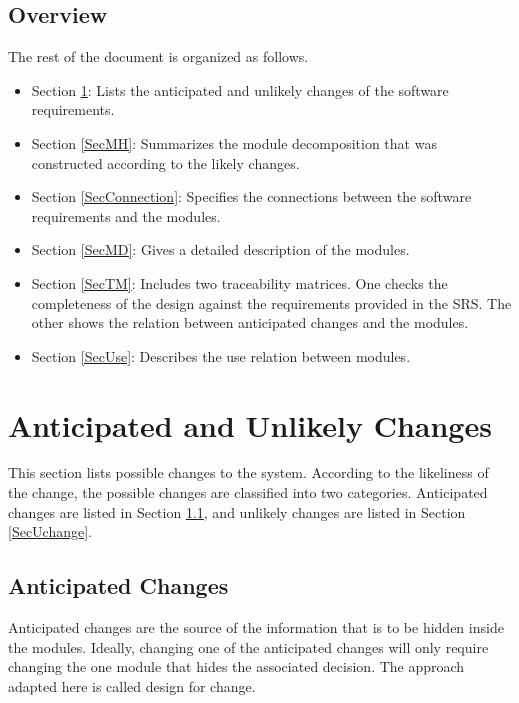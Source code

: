 \documentclass[12pt, titlepage]{article}
\begin{document}
\subsection{Overview}
The rest of the document is organized as follows. 
\begin{itemize}
  \item Section \ref{SecChange}: Lists the anticipated and unlikely changes of the software
  requirements.
  \item Section \ref{SecMH}: Summarizes the module decomposition that
  was constructed according to the likely changes.
  \item Section \ref{SecConnection}: Specifies the connections between the software requirements and the modules.
  \item Section \ref{SecMD}: Gives a detailed description of the
  modules.
  \item Section \ref{SecTM}: Includes two traceability matrices. One checks
  the completeness of the design against the requirements provided in the SRS. The
  other shows the relation between anticipated changes and the modules.
  \item Section \ref{SecUse}: Describes the use relation between modules.
\end{itemize}
\section{Anticipated and Unlikely Changes} \label{SecChange}

This section lists possible changes to the system. According to the likeliness
of the change, the possible changes are classified into two
categories. Anticipated changes are listed in Section \ref{SecAchange}, and
unlikely changes are listed in Section \ref{SecUchange}.

\subsection{Anticipated Changes} \label{SecAchange}

Anticipated changes are the source of the information that is to be hidden
inside the modules. Ideally, changing one of the anticipated changes will only
require changing the one module that hides the associated decision. The approach
adapted here is called design for
change.
\end{document}
